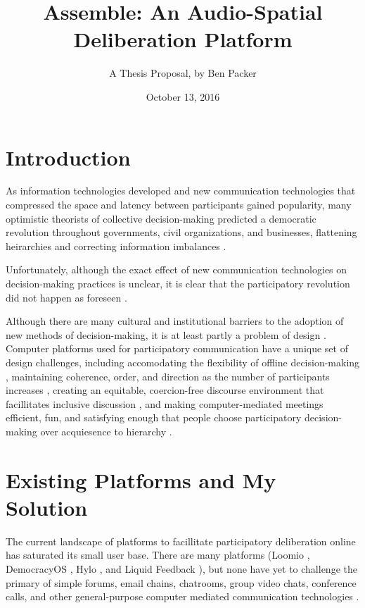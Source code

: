 \documentclass{article}
\begin{document}
\title{Assemble: An Audio-Spatial Deliberation Platform}
\date{October 13, 2016}
\author{A Thesis Proposal, by Ben Packer}

\maketitle{}

\section{Introduction}

As information technologies developed and new communication technologies that
compressed the space and latency between participants gained popularity, many
optimistic theorists of collective decision-making predicted a democratic
revolution throughout governments, civil organizations, and businesses, flattening
heirarchies and correcting information imbalances \cite{hartz}.

\medskip

Unfortunately, although the exact effect of new communication technologies on
decision-making practices is unclear, it is clear that the participatory revolution
did not happen as foreseen \cite{hartz}.

\medskip

Although there are many cultural and institutional barriers to the adoption of
new methods of decision-making, it is at least partly a problem of design \cite{towne}. Computer
platforms used for participatory communication have a unique set of design challenges,
including accomodating the flexibility of offline decision-making \cite{seeds},
maintaining coherence, order, and direction as the number of participants increases \cite{pingree},
creating an equitable, coercion-free discourse environment that facillitates inclusive
discussion \cite{habermas}, and making computer-mediated meetings efficient, fun, and satisfying
enough that people choose participatory decision-making over acquiesence to
hierarchy \cite{graeber}\cite{lupia}.

\section{Existing Platforms and My Solution}

The current landscape of platforms to facillitate participatory deliberation online has
saturated its small user base. There are many platforms
(Loomio \cite{loomio}, DemocracyOS \cite{dos}, Hylo \cite{hylo}, and Liquid Feedback \cite{lf}),
but none have yet to challenge the primary of simple forums, email chains,
chatrooms, group video chats, conference calls, and other general-purpose
computer mediated communication technologies \cite{}.
\end{document}
